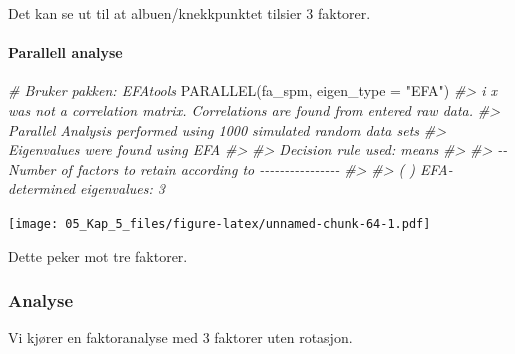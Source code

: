 \documentclass[
]{article}
\newenvironment{Shaded}{\begin{snugshade}}{\end{snugshade}}
\newcommand{\AttributeTok}[1]{\textcolor[rgb]{0.77,0.63,0.00}{#1}}
\newcommand{\CommentTok}[1]{\textcolor[rgb]{0.56,0.35,0.01}{\textit{#1}}}
\newcommand{\FunctionTok}[1]{\textcolor[rgb]{0.00,0.00,0.00}{#1}}
\newcommand{\NormalTok}[1]{#1}
\newcommand{\StringTok}[1]{\textcolor[rgb]{0.31,0.60,0.02}{#1}}
\begin{document}
Det kan se ut til at albuen/knekkpunktet tilsier 3 faktorer.

\hypertarget{parallell-analyse-2}{%
\paragraph{Parallell analyse}\label{parallell-analyse-2}}

\begin{Shaded}
\begin{Highlighting}[]
\CommentTok{\# Bruker pakken: EFAtools}
\FunctionTok{PARALLEL}\NormalTok{(fa\_spm, }\AttributeTok{eigen\_type =} \StringTok{"EFA"}\NormalTok{)}
\CommentTok{\#\textgreater{} i \textquotesingle{}x\textquotesingle{} was not a correlation matrix. Correlations are found from entered raw data.}
\CommentTok{\#\textgreater{} Parallel Analysis performed using 1000 simulated random data sets}
\CommentTok{\#\textgreater{} Eigenvalues were found using EFA}
\CommentTok{\#\textgreater{} }
\CommentTok{\#\textgreater{} Decision rule used: means}
\CommentTok{\#\textgreater{} }
\CommentTok{\#\textgreater{} {-}{-} Number of factors to retain according to {-}{-}{-}{-}{-}{-}{-}{-}{-}{-}{-}{-}{-}{-}{-}{-}}
\CommentTok{\#\textgreater{} }
\CommentTok{\#\textgreater{} ( ) EFA{-}determined eigenvalues:  3}
\end{Highlighting}
\end{Shaded}

\texttt{[image: 05\_Kap\_5\_files/figure-latex/unnamed-chunk-64-1.pdf]}

Dette peker mot tre faktorer.

\hypertarget{analyse}{%
\subsubsection{Analyse}\label{analyse}}

Vi kjører en faktoranalyse med 3 faktorer uten rotasjon.
\end{document}
